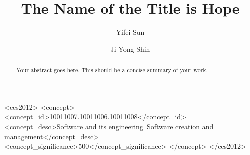 \documentclass[sigplan,screen,review]{acmart}
\begin{document}
\title{The Name of the Title is Hope}

\author{Yifei Sun}

\author{Ji-Yong Shin}


\renewcommand{\shortauthors}{Sun et al.}

\begin{abstract}
  {\color{red}
    Your abstract goes here. This should be a concise summary of your work.
  }
\end{abstract}

\begin{CCSXML}
  <ccs2012>
  <concept>
  <concept_id>10011007.10011006.10011008</concept_id>
  <concept_desc>Software and its engineering~Software creation and
  management</concept_desc>
  <concept_significance>500</concept_significance>
  </concept>
  </ccs2012>
\end{CCSXML}



\maketitle










\end{document}
